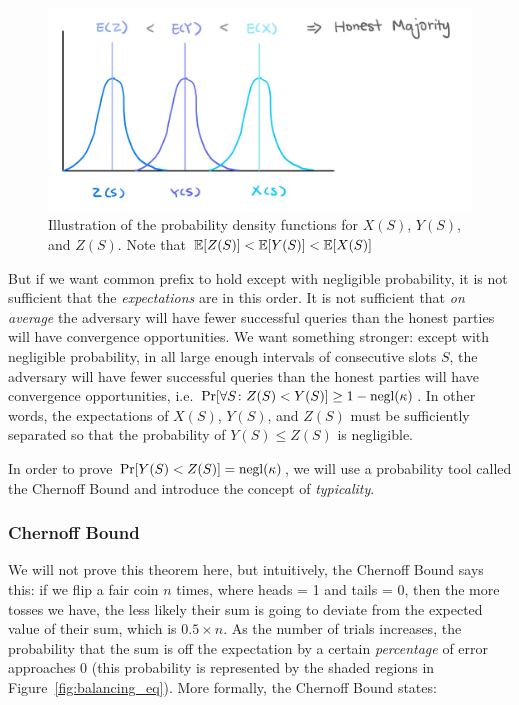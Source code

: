 \begin{figure}[ht]
    \centering
    \includegraphics[width=14cm]{figures/honest-maj}
    \caption{Illustration of the probability density functions for $X(S)$, $Y(S)$, and $Z(S)$. Note that $\mathbb{E}[Z(S)] < \mathbb{E}[Y(S)] < \mathbb{E}[X(S)]$}
    \label{fig:expectation_gap}
\end{figure}

But if we want common prefix to hold except with negligible probability, it is not sufficient that the \emph{expectations} are in this order. It is not sufficient that \emph{on average} the adversary will have fewer successful queries than the honest parties will have convergence opportunities. We want something stronger: except with negligible probability, in all large enough intervals of consecutive slots $S$, the adversary will have fewer successful queries than the honest parties will have convergence opportunities, i.e. $\Pr[\forall S\colon Z(S) < Y(S)] \geq 1 - \mathrm{negl}(\kappa)$. In other words, the expectations of $X(S)$, $Y(S)$, and $Z(S)$ must be sufficiently separated so that the probability of $Y(S) \leq Z(S)$ is negligible.

In order to prove $\Pr[Y(S) < Z(S)] = \mathrm{negl}(\kappa)$, we will use a probability tool called the Chernoff Bound and introduce the concept of \textit{typicality}.

\subsubsection{Chernoff Bound}

We will not prove this theorem here, but intuitively, the Chernoff Bound says this: if we flip a fair coin $n$ times, where heads = 1 and tails = 0, then the more tosses we have, the less likely their sum is going to deviate from the expected value of their sum, which is $0.5 \times n$. As the number of trials increases, the probability that the sum is off the expectation by a certain \emph{percentage} of error approaches 0 (this probability is represented by the shaded regions in Figure~\ref{fig:balancing_eq}). More formally, the Chernoff Bound states:

